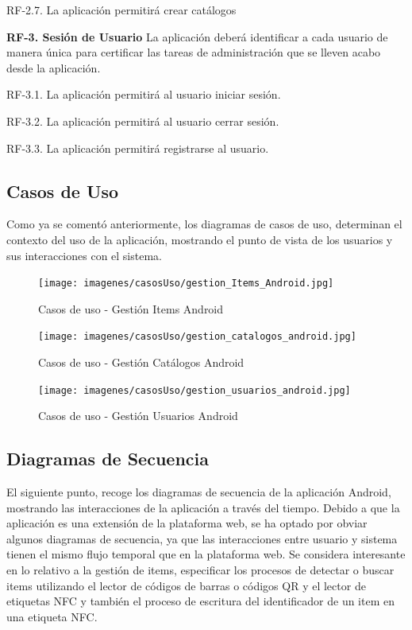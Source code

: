 \documentclass[a4paper,11pt]{book}
\begin{document}
	RF-2.7. La aplicación permitirá crear catálogos
	
	
\textbf{RF-3. Sesión de Usuario} La aplicación deberá identificar a cada usuario de manera única para certificar las tareas de administración que se lleven acabo desde la aplicación. 


	RF-3.1. La aplicación permitirá al usuario iniciar sesión.
	
	RF-3.2. La aplicación permitirá al usuario cerrar sesión.
	
	RF-3.3. La aplicación permitirá registrarse al usuario.



\subsection{Casos de Uso}
Como ya se comentó anteriormente, los diagramas de casos de uso, determinan el contexto del uso de la aplicación, mostrando el punto de vista de los usuarios  y sus interacciones con el sistema.

\begin{figure}[H]  
\centering 
\texttt{[image: imagenes/casosUso/gestion\_Items\_Android.jpg]}
\caption{ Casos de uso - Gestión Items Android\cite{diagrama} }  
\end{figure}

\begin{figure}[H]  
\centering 
\texttt{[image: imagenes/casosUso/gestion\_catalogos\_android.jpg]}
\caption{ Casos de uso - Gestión Catálogos Android\cite{diagrama}  }  
\end{figure}

\begin{figure}[H]  
\centering 
\texttt{[image: imagenes/casosUso/gestion\_usuarios\_android.jpg]}
\caption{ Casos de uso - Gestión Usuarios Android\cite{diagrama}  }  
\end{figure}


\subsection{Diagramas de Secuencia}
El siguiente punto, recoge los diagramas de secuencia de la aplicación Android,  mostrando las interacciones de la aplicación a través del tiempo. Debido a que la aplicación es una extensión de la plataforma web, se ha optado por obviar algunos diagramas de secuencia, ya que las interacciones entre usuario y sistema tienen el mismo flujo temporal que en la plataforma web. Se considera interesante en lo relativo a la gestión de items, especificar los procesos de detectar o buscar items utilizando el lector de códigos de barras o códigos QR y el lector de etiquetas NFC y también el proceso de escritura del identificador de un item en una etiqueta NFC. 
\end{document}
